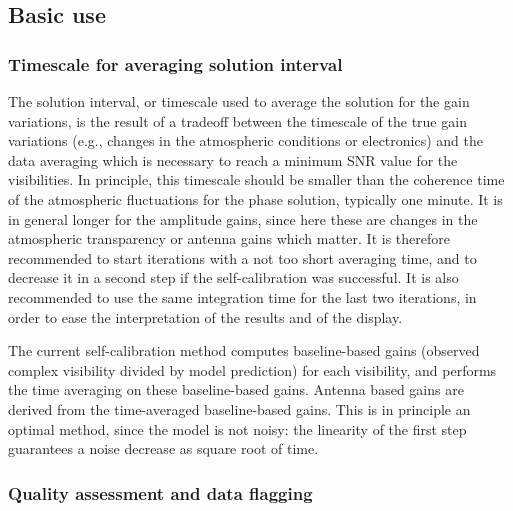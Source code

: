 \subsection{Basic use }
\subsubsection{Timescale for averaging solution interval}

The solution interval, or timescale used to average the solution for 
the gain variations, is the result of a tradeoff between the timescale 
of the true gain variations (e.g., changes in the atmospheric 
conditions or electronics) and the data averaging which is necessary to 
reach a minimum SNR value for the visibilities. In principle, this 
timescale should be smaller than the coherence time
of the atmospheric fluctuations for the phase solution, typically
one minute. It is in general longer for the amplitude gains, since here
these are changes in the atmospheric transparency or antenna gains
which matter. It is 
therefore recommended to start iterations with a not too short 
averaging time, and to decrease it in a second step if the 
self-calibration was successful. It is also recommended to use the same 
integration time for the last two iterations, in order to ease the 
interpretation of the results and of the  display.
 
The current self-calibration method computes baseline-based
gains (observed complex visibility divided by model prediction) 
for each visibility, and performs the time averaging on these
baseline-based gains. Antenna based gains are derived from
the time-averaged baseline-based gains.  This is in principle an 
optimal method, since the model is not noisy: the linearity of the
first step guarantees a noise decrease as square root of time.


\subsubsection{Quality assessment and data flagging}

